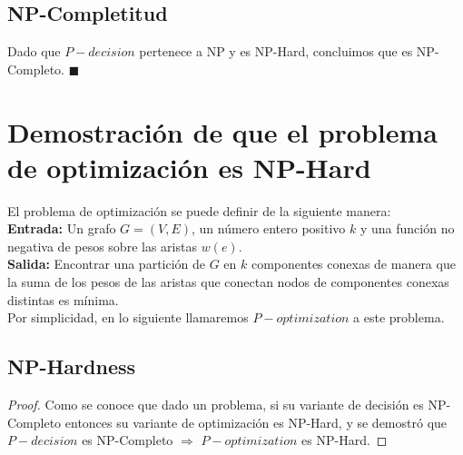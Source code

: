 \documentclass[a4paper,12pt]{article}
\begin{document}
\subsection{NP-Completitud}

Dado que $P-decision$ pertenece a NP y es NP-Hard, concluimos que es NP-Completo. $\blacksquare$


\section{Demostración de que el problema de optimización es NP-Hard}

El problema de optimización se puede definir de la siguiente manera:\\

\textbf{Entrada:} Un grafo \( G = (V, E) \), un número entero positivo \( k \) y 
una función no negativa de pesos sobre las aristas $w(e)$.\\

\textbf{Salida:} Encontrar una partición de \( G \) en \( k \) componentes conexas de manera que 
la suma de los pesos de las aristas que conectan nodos de componentes conexas distintas es mínima.\\

Por simplicidad, en lo siguiente llamaremos $P-optimization$ a este problema. 

\subsection{NP-Hardness}

\begin{proof}
    Como se conoce que dado un problema, si su variante de decisión es NP-Completo entonces su variante de optimización es NP-Hard, y se demostró que $P-decision$ es NP-Completo $\Rightarrow$ $P-optimization$ es NP-Hard.
\end{proof}
\end{document}
